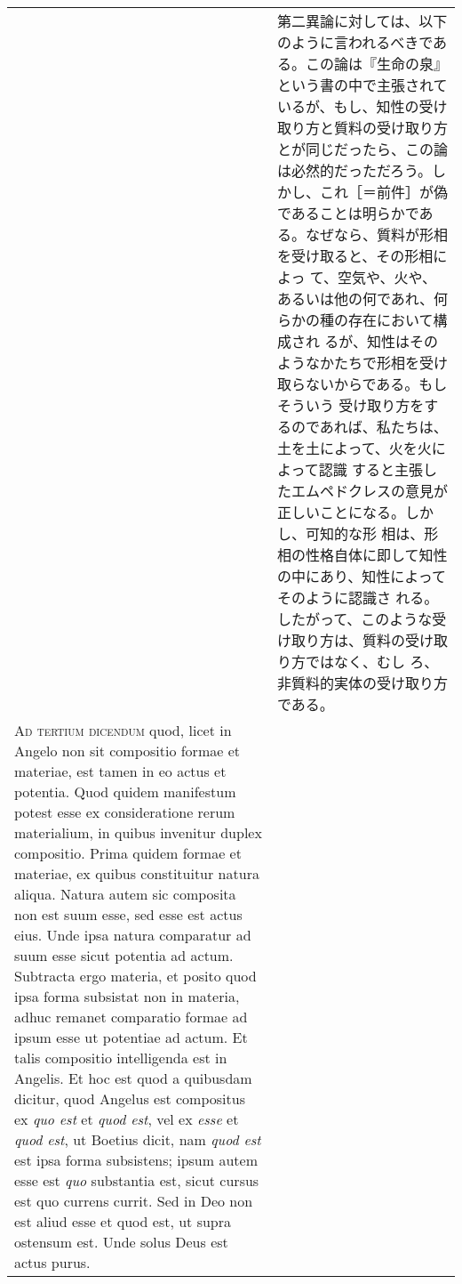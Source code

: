 \documentclass[10pt]{jsarticle} %
\begin{document}
\begin{longtable}{p{21em}p{21em}}
&


第二異論に対しては、以下のように言われるべきである。この論は『生命の泉』
という書の中で主張されているが、もし、知性の受け取り方と質料の受け取り方
とが同じだったら、この論は必然的だっただろう。しかし、これ［＝前件］が偽
であることは明らかである。なぜなら、質料が形相を受け取ると、その形相によっ
て、空気や、火や、あるいは他の何であれ、何らかの種の存在において構成され
るが、知性はそのようなかたちで形相を受け取らないからである。もしそういう
受け取り方をするのであれば、私たちは、土を土によって、火を火によって認識
すると主張したエムペドクレスの意見が正しいことになる。しかし、可知的な形
相は、形相の性格自体に即して知性の中にあり、知性によってそのように認識さ
れる。したがって、このような受け取り方は、質料の受け取り方ではなく、むし
ろ、非質料的実体の受け取り方である。



\\


{\scshape Ad tertium dicendum} quod, licet in Angelo non sit compositio
formae et materiae, est tamen in eo actus et potentia. Quod quidem
manifestum potest esse ex consideratione rerum materialium, in quibus
invenitur duplex compositio. Prima quidem formae et materiae, ex quibus
constituitur natura aliqua. Natura autem sic composita non est suum
esse, sed esse est actus eius. Unde ipsa natura comparatur ad suum esse
sicut potentia ad actum. Subtracta ergo materia, et posito quod ipsa
forma subsistat non in materia, adhuc remanet comparatio formae ad ipsum
esse ut potentiae ad actum. Et talis compositio intelligenda est in
Angelis. Et hoc est quod a quibusdam dicitur, quod Angelus est
compositus ex {\itshape quo est} et {\itshape quod est}, vel ex
{\itshape esse} et {\itshape quod est}, ut Boetius dicit, nam {\itshape
quod est} est ipsa forma subsistens; ipsum autem esse est {\itshape quo}
substantia est, sicut cursus est quo currens currit. Sed in Deo non est
aliud esse et quod est, ut supra ostensum est. Unde solus Deus est actus
purus.


&


\end{longtable}
\end{document}

